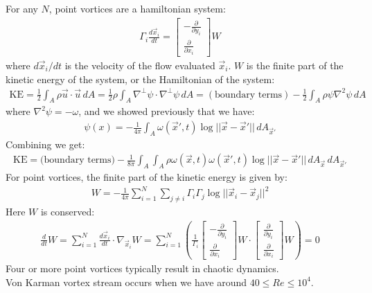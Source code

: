 \documentclass[11pt]{book}
\theoremstyle{break}
\theoremstyle{break}
\newcommand{\pd}{\partial}
\newcommand{\bmat}[1]{\begin{bmatrix} #1 \end{bmatrix}}
\begin{document}
For any $N$, point vortices are a hamiltonian system:
\begin{align*}
\Gamma_i \frac{d\vec{x}_i}{dt} = \bmat{- \frac{\partial}{\partial y_i} \\ \frac{\partial}{\partial x_i}}W
\end{align*}
where $d\vec{x}_i/dt$ is the velocity of the flow evaluated $\vec{x}_i$. $W$ is the finite part of the kinetic energy of the system, or the Hamiltonian of the system:
\begin{align*}
\text{KE} = \frac{1}{2}\int_A \rho \vec{u}\cdot \vec{u}\, dA = \frac{1}{2}\rho \int_A \nabla^{\perp}\psi \cdot \nabla^{\perp}\psi \, dA = (\text{boundary terms}) - \frac{1}{2}\int_A \rho \psi \nabla^2 \psi \, dA
\end{align*}
where $\nabla^2 \psi = -\omega$, and we showed previously that we have:
\begin{align*}
\psi(x) = -\frac{1}{4\pi}\int_A \omega(\vec{x}',t) \log||\vec{x} - \vec{x}'||\, dA_{\vec{x}'}
\end{align*}
Combining we get:
\begin{align*}
\text{KE} = \text{(boundary terms)} - \frac{1}{8\pi}\int_A\int_A \rho \omega(\vec{x},t) \omega(\vec{x}',t) \log||\vec{x}-\vec{x}'||\, dA_{\vec{x}}\, dA_{\vec{x}'}
\end{align*}
For point vortices, the finite part of the kinetic energy is given by:
\begin{align*}
W = -\frac{1}{4\pi}\sum_{i=1}^N \sum_{j\neq i}\Gamma_i \Gamma_j\log||\vec{x}_i - \vec{x}_j||^2
\end{align*}
Here $W$ is conserved:
\begin{align*}
\frac{d}{dt}W = \sum_{i=1}^N \frac{d\vec{x}_i}{dt} \cdot \nabla_{\vec{x}_i}W = \sum_{i=1}^N\left( \frac{1}{\Gamma_i}\bmat{- \frac{\partial}{\partial y_i}\\\frac{\pd}{\pd x_i} }W \cdot \bmat{\frac{\partial}{\partial y_i}\\\frac{\pd}{\pd x_i}}W\right) = 0
\end{align*}
Four or more point vortices typically result in chaotic dynamics. \\
Von Karman vortex stream occurs when we have around $40 \leq Re \leq 10^4$. \\
\end{document}
